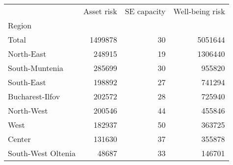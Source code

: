 \begin{tabular}{lrrr}
\toprule
{} &  Asset risk &  SE capacity &  Well-being risk \\
Region             &             &              &                  \\
\midrule
Total              &     1499878 &           30 &          5051644 \\
North-East         &      248915 &           19 &          1306440 \\
South-Muntenia     &      285699 &           30 &           955820 \\
South-East         &      198892 &           27 &           741294 \\
Bucharest-Ilfov    &      202572 &           28 &           725940 \\
North-West         &      200546 &           44 &           455846 \\
West               &      182937 &           50 &           363725 \\
Center             &      131630 &           37 &           355878 \\
South-West Oltenia &       48687 &           33 &           146701 \\
\bottomrule
\end{tabular}
